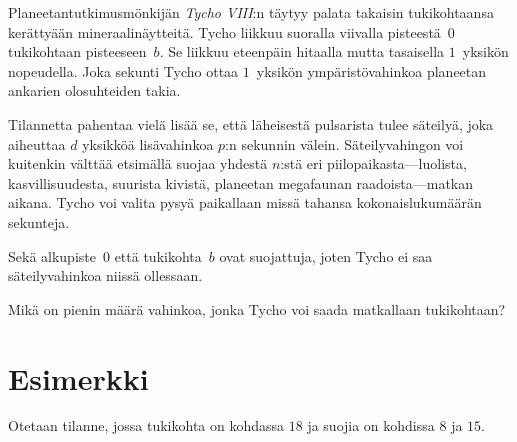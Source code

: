 

\noindent
Planeetantutkimusmönkijän \emph{Tycho VIII}:n täytyy palata takaisin tukikohtaansa 
kerättyään mineraalinäytteitä.
Tycho liikkuu suoralla viivalla pisteestä~$0$ tukikohtaan pisteeseen~$b$.
Se liikkuu eteenpäin hitaalla mutta tasaisella $1$~yksikön nopeudella.
Joka sekunti Tycho ottaa $1$~yksikön ympäristövahinkoa planeetan ankarien 
olosuhteiden takia.

Tilannetta pahentaa vielä lisää se, että läheisestä pulsarista tulee säteilyä, joka 
aiheuttaa $d$ yksikköä lisävahinkoa $p$:n sekunnin välein.
Säteilyvahingon voi kuitenkin välttää etsimällä suojaa yhdestä $n$:stä eri 
piilopaikasta---luolista, kasvillisuudesta, suurista kivistä, planeetan megafaunan 
raadoista---matkan aikana.
Tycho voi valita pysyä paikallaan missä tahansa kokonaislukumäärän sekunteja.

Sekä alkupiste~$0$ että tukikohta~$b$ ovat suojattuja, joten Tycho ei saa 
säteilyvahinkoa niissä ollessaan.

\medskip
Mikä on pienin määrä vahinkoa, jonka Tycho voi saada matkallaan tukikohtaan?

\section*{Esimerkki}

Otetaan tilanne, jossa tukikohta on kohdassa $18$ ja suojia on kohdissa $8$ ja $15$.

